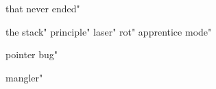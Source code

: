 

 that never ended"



 the stack"
 principle"
 laser"
 rot"
 apprentice mode"



 pointer bug"





 mangler"


